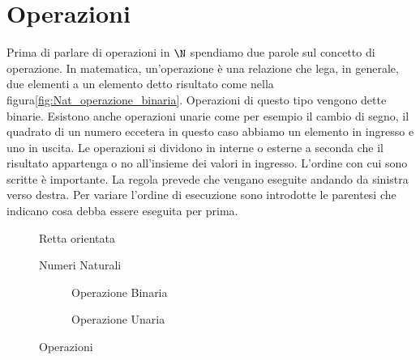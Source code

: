 \section{Operazioni}
Prima di parlare di operazioni in $\N$ spendiamo due parole sul concetto di operazione. In matematica, un'operazione è una relazione che lega, in generale, due elementi a un elemento detto risultato come nella figura\nobs\vref{fig:Nat_operazione_binaria}. Operazioni di questo tipo vengono dette binarie. Esistono anche operazioni unarie come per esempio il cambio di segno, il quadrato di un numero eccetera in questo caso abbiamo un elemento in ingresso e uno in uscita. Le operazioni si dividono in interne o esterne a seconda che il risultato appartenga o no all'insieme dei valori in ingresso. L'ordine con cui sono scritte è importante. La regola prevede che vengano eseguite andando da sinistra verso destra. Per variare l'ordine di esecuzione sono introdotte le parentesi che indicano cosa debba essere eseguita per prima.
\begin{figure} 
	\centering

	\caption{Retta orientata}
	\label{fig:NumeriNaturaliRetta}\end{figure}
\begin{figure} 
	\centering

	\caption{Numeri Naturali}
	\label{fig:NumeriNaturali}\end{figure}
\begin{figure}
	\begin{subfigure}[b]{.5\linewidth}
		\centering

	\caption{Operazione Binaria}
	\label{fig:Nat_operazione_binaria}
	\end{subfigure}%
	\begin{subfigure}[b]{.5\linewidth}
	\centering

	\caption{Operazione Unaria}
	\label{fig:Nat_operazione_unaria}
	\end{subfigure}
		\caption{Operazioni}
	\label{fig:OPerzionicasogen}
\end{figure}
